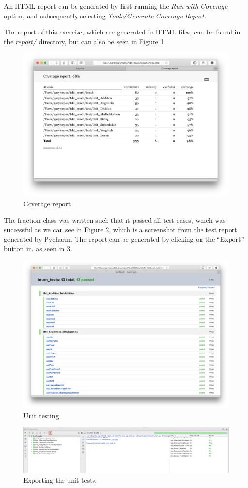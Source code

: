 \documentclass[../main/main.tex]{subfiles}
\begin{document}
An HTML report can be generated by first running the \textit{Run with
  Coverage} option, and subsequently selecting \textit{Tools/Generate
  Coverage Report}.

The report of this exercise, which are generated in HTML files, can be
found in the \textit{report/} directory, but can also be seen in
Figure \ref{fig:coverage}. 

\begin{figure}[H]
  \centering
  \includegraphics[width=\linewidth]{../figures/coverage_report.png}
  \caption{Coverage report}
  \label{fig:coverage}
\end{figure}

The fraction class was written such that it passed all test cases,
which was successful as we can see in Figure \ref{fig:unit}, which is
a screenshot from the test report generated by Pycharm. The report can be generated by clicking on the ``Export'' button in, as seen in \ref{fig:export}.

\begin{figure}[H]
  \centering
  \includegraphics[width=0.7\linewidth]{../figures/unit_testing.png}
  \caption{Unit testing.}
  \label{fig:unit}
\end{figure}

\begin{figure}[H]
  \centering
  \includegraphics[width=0.8\linewidth]{../figures/export.png}
  \caption{Exporting the unit tests.}
  \label{fig:export}
\end{figure}
\end{document}
